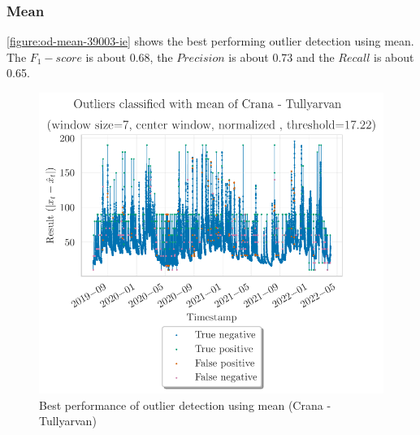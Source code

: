 \subsubsection{Mean}
\autoref{figure:od-mean-39003-ie} shows the best performing outlier detection using mean. The $F_1-score$ is about 0.68, the $Precision$ is about 0.73 and the $Recall$ is about 0.65.
\begin{figure}[H]
    \centering 
    \includegraphics{plots/pdfs/39003-ie/od_mean_39003-ie_all.pdf}
    \caption{Best performance of outlier detection using mean (Crana - Tullyarvan)}
    \label{figure:od-mean-39003-ie}
\end{figure}
\clearpage
